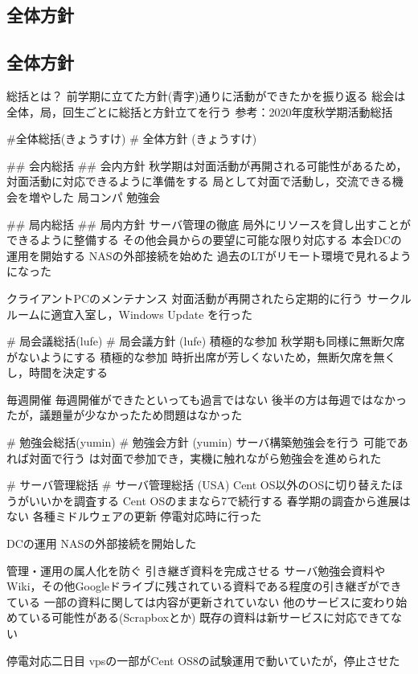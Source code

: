 \subsection*{全体方針}
\subsection*{全体方針}

総括とは？
前学期に立てた方針(青字)通りに活動ができたかを振り返る
総会は全体，局，回生ごとに総括と方針立てを行う
参考：2020年度秋学期活動総括

\#全体総括(きょうすけ)
\# 全体方針 (きょうすけ)

\#\# 会内総括
\#\# 会内方針
秋学期は対面活動が再開される可能性があるため，対面活動に対応できるように準備をする
局として対面で活動し，交流できる機会を増やした
局コンパ
勉強会

\#\# 局内総括
\#\# 局内方針
サーバ管理の徹底
局外にリソースを貸し出すことができるように整備する
その他会員からの要望に可能な限り対応する
本会DCの運用を開始する
NASの外部接続を始めた
過去のLTがリモート環境で見れるようになった


クライアントPCのメンテナンス
対面活動が再開されたら定期的に行う
サークルルームに適宜入室し，Windows Update を行った

\# 局会議総括(lufe)
\# 局会議方針 (lufe)
積極的な参加
秋学期も同様に無断欠席がないようにする
積極的な参加
時折出席が芳しくないため，無断欠席を無くし，時間を決定する

毎週開催
毎週開催ができたといっても過言ではない
後半の方は毎週ではなかったが，議題量が少なかったため問題はなかった

\# 勉強会総括(yumin)
\# 勉強会方針 (yumin)
サーバ構築勉強会を行う
可能であれば対面で行う
\firstGrade{}は対面で参加でき，実機に触れながら勉強会を進められた

\# サーバ管理総括
\# サーバ管理総括 (USA)
Cent OS以外のOSに切り替えたほうがいいかを調査する
Cent OSのままなら7で続行する
春学期の調査から進展はない
各種ミドルウェアの更新
停電対応時に行った

DCの運用
NASの外部接続を開始した

管理・運用の属人化を防ぐ
引き継ぎ資料を完成させる
サーバ勉強会資料やWiki，その他Googleドライブに残されている資料である程度の引き継ぎができている
一部の資料に関しては内容が更新されていない
他のサービスに変わり始めている可能性がある(Scrapboxとか)
既存の資料は新サービスに対応できてない

停電対応二日目
vpsの一部がCent OS8の試験運用で動いていたが，停止させた

